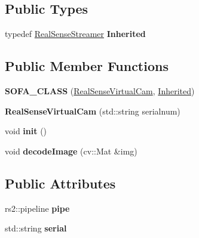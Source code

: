 \subsection*{Public Types}
\begin{DoxyCompactItemize}
\item 
\mbox{\label{classsofa_1_1rgbdtracking_1_1_real_sense_virtual_cam_aaf38bfd843842903f4b1e4457af3240f}} 
typedef \hyperlink{classsofa_1_1rgbdtracking_1_1_real_sense_streamer}{Real\+Sense\+Streamer} {\bfseries Inherited}
\end{DoxyCompactItemize}
\subsection*{Public Member Functions}
\begin{DoxyCompactItemize}
\item 
\mbox{\label{classsofa_1_1rgbdtracking_1_1_real_sense_virtual_cam_ac20d0286ccdd5caff30412db342814dc}} 
{\bfseries S\+O\+F\+A\+\_\+\+C\+L\+A\+SS} (\hyperlink{classsofa_1_1rgbdtracking_1_1_real_sense_virtual_cam}{Real\+Sense\+Virtual\+Cam}, \hyperlink{classsofa_1_1rgbdtracking_1_1_real_sense_streamer}{Inherited})
\item 
\mbox{\label{classsofa_1_1rgbdtracking_1_1_real_sense_virtual_cam_a673da2cd1e90f9448b458066e2f81eee}} 
{\bfseries Real\+Sense\+Virtual\+Cam} (std\+::string serialnum)
\item 
\mbox{\label{classsofa_1_1rgbdtracking_1_1_real_sense_virtual_cam_adc341623bbde6d3cc70f2cdc8a0263ef}} 
void {\bfseries init} ()
\item 
\mbox{\label{classsofa_1_1rgbdtracking_1_1_real_sense_virtual_cam_ac4eceae3e70c1cdb0f597b45e439cdc1}} 
void {\bfseries decode\+Image} (cv\+::\+Mat \&img)
\end{DoxyCompactItemize}
\subsection*{Public Attributes}
\begin{DoxyCompactItemize}
\item 
\mbox{\label{classsofa_1_1rgbdtracking_1_1_real_sense_virtual_cam_aebfd00b71c1ce8a5505a602386dd3864}} 
rs2\+::pipeline {\bfseries pipe}
\item 
\mbox{\label{classsofa_1_1rgbdtracking_1_1_real_sense_virtual_cam_a45ccc29bedb1dd6f5357a0a3ecb8f8bb}} 
std\+::string {\bfseries serial}
\end{DoxyCompactItemize}
